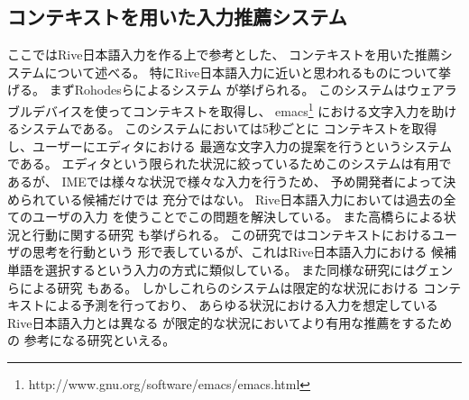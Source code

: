 \subsection{コンテキストを用いた入力推薦システム}
ここではRive日本語入力を作る上で参考とした、
コンテキストを用いた推薦システムについて述べる。
特にRive日本語入力に近いと思われるものについて挙げる。
まずRohodesらによるシステム\cite{ROHODESB.J.:1997}
が挙げられる。
このシステムはウェアラブルデバイスを使ってコンテキストを取得し、
emacs\footnote{http://www.gnu.org/software/emacs/emacs.html}
における文字入力を助けるシステムである。
このシステムにおいては5秒ごとに
コンテキストを取得し、ユーザーにエディタにおける
最適な文字入力の提案を行うというシステムである。
エディタという限られた状況に絞っているためこのシステムは有用であるが、
IMEでは様々な状況で様々な入力を行うため、
予め開発者によって決められている候補だけでは
充分ではない。
Rive日本語入力においては過去の全てのユーザの入力
を使うことでこの問題を解決している。
また高橋らによる状況と行動に関する研究
\cite{高橋公海:2013-07-15}も挙げられる。
この研究ではコンテキストにおけるユーザの思考を行動という
形で表しているが、これはRive日本語入力における
候補単語を選択するという入力の方式に類似している。
また同様な研究にはグェンらによる研究
\cite{ミンテイグェン:2010-01-15}もある。
しかしこれらのシステムは限定的な状況における
コンテキストによる予測を行っており、
あらゆる状況における入力を想定しているRive日本語入力とは異なる
が限定的な状況においてより有用な推薦をするための
参考になる研究といえる。
